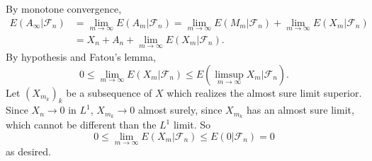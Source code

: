 \documentclass[10pt]{article}
\theoremstyle{definition}
\begin{document}
By monotone convergence,
\begin{align*}
E(A_\infty|\mathcal F_n) &= \lim_{m \to \infty} E(A_m|\mathcal F_n) = \lim_{m \to \infty} E(M_m|\mathcal F_n) + \lim_{m \to \infty} E(X_m|\mathcal F_n)\\
&= X_n + A_n + \lim_{m \to \infty} E(X_m|\mathcal F_n).
\end{align*}
By hypothesis and Fatou's lemma,
$$0 \leq \lim_{m \to \infty} E(X_m|\mathcal F_n) \leq E\left(\limsup_{m \to \infty} X_m\bigg|\mathcal F_n\right).$$
Let $(X_{m_k})_k$ be a subsequence of $X$ which realizes the almost sure limit superior.
Since $X_n \to 0$ in $L^1$, $X_{m_k} \to 0$ almost surely, since $X_{m_k}$ has an almost sure limit, which cannot be different than the $L^1$ limit.
So
$$0 \leq \lim_{m \to \infty} E(X_m|\mathcal F_n) \leq E(0|\mathcal F_n) = 0$$
as desired.
\end{document}
